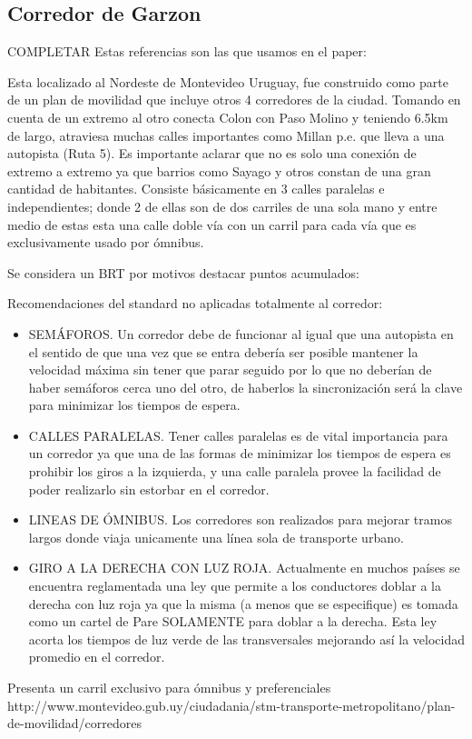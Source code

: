 \subsection{Corredor de Garzon}	

COMPLETAR
Estas referencias son las que usamos en el paper:
\citep{olivera2013}
\citep{olivera2015}	


Esta localizado al Nordeste de Montevideo Uruguay, fue construido como parte de un plan de movilidad que incluye otros 4 corredores de la ciudad. Tomando en cuenta de un extremo al otro conecta Colon con Paso Molino y teniendo 6.5km de largo, atraviesa muchas calles importantes como Millan p.e. que lleva a una autopista (Ruta 5). Es importante aclarar que no es solo una conexión de extremo a extremo ya que barrios como Sayago y otros constan de una gran cantidad de habitantes.
Consiste básicamente en 3 calles paralelas e independientes; donde 2 de ellas son de dos carriles de una sola mano y entre medio de estas esta una calle doble vía con un carril para cada vía que es exclusivamente usado por ómnibus.


Se considera un BRT por motivos destacar puntos acumulados:

Recomendaciones del standard no aplicadas totalmente al corredor:
\begin{itemize}
	\item SEMÁFOROS. Un corredor debe de funcionar al igual que una autopista en el sentido de que una vez que se entra debería ser posible mantener la velocidad máxima sin tener que parar seguido por lo que no deberían de haber semáforos cerca uno del otro, de haberlos la sincronización será la clave para minimizar los tiempos de espera.
	\item CALLES PARALELAS. Tener calles paralelas es de vital importancia para un corredor ya que una de las formas de minimizar los tiempos de espera es prohibir los giros a la izquierda, y una calle paralela provee la facilidad de poder realizarlo sin estorbar en el corredor.
	\item LINEAS DE ÓMNIBUS. Los corredores son realizados para mejorar tramos largos donde viaja unicamente una línea sola de transporte urbano.
	\item GIRO A LA DERECHA CON LUZ ROJA. Actualmente en muchos países se encuentra reglamentada una ley que permite a los conductores doblar a la derecha con luz roja ya que la misma (a menos que se especifique) es tomada como un cartel de Pare SOLAMENTE para doblar a la derecha. Esta ley acorta los tiempos de luz verde de las transversales mejorando así la velocidad promedio en el corredor.
\end{itemize}
Presenta un carril exclusivo para ómnibus y preferenciales
http://www.montevideo.gub.uy/ciudadania/stm-transporte-metropolitano/plan-de-movilidad/corredores

